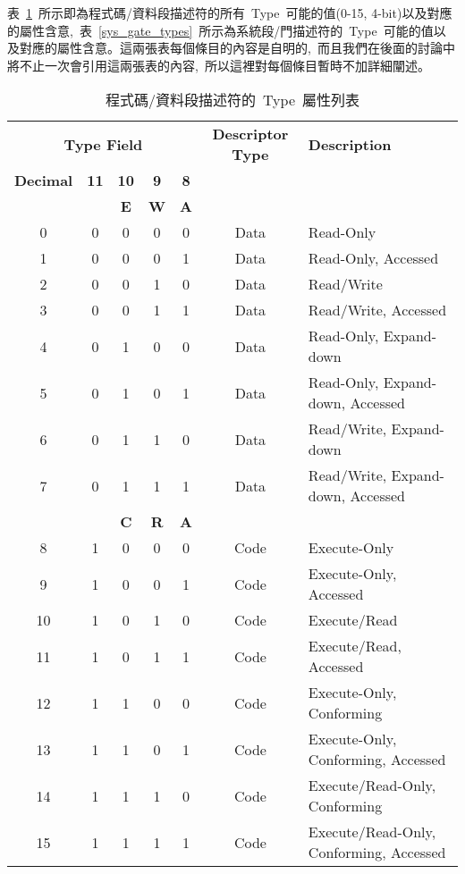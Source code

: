 \begin{itemize}
表~\ref{code_data_types}~所示即為程式碼/資料段描述符的所有~Type~可能的值(0-15, 4-bit)以及對應的屬性含意,~表~\ref{sys_gate_types}~所示為系統段/門描述符的~Type~可能的值以及對應的屬性含意。這兩張表每個條目的內容是自明的,~而且我們在後面的討論中將不止一次會引用這兩張表的內容,~所以這裡對每個條目暫時不加詳細闡述。

\begin{center}\begin{longtable}{c|c|c|c|c|c|l}
\caption[]{程式碼/資料段描述符的~Type~屬性列表}\label{code_data_types}\\
\hline
\multicolumn{5}{c|}{\textbf{Type Field}} & \textbf{Descriptor Type} & \textbf{Description}\bigstrut\\
\cline{1-5}
\textbf{Decimal} & \textbf{11} & \textbf{10} & \textbf{9} & \textbf{8} & & \\
        &    &  \textbf{E} & \textbf{W} & \textbf{A} & & \\
\hline
0 & 0 & 0 & 0 & 0 & Data & Read-Only\\
1 & 0 & 0 & 0 & 1 & Data & Read-Only, Accessed\\
2 & 0 & 0 & 1 & 0 & Data & Read/Write\\
3 & 0 & 0 & 1 & 1 & Data & Read/Write, Accessed\\
4 & 0 & 1 & 0 & 0 & Data & Read-Only, Expand-down\\
5 & 0 & 1 & 0 & 1 & Data & Read-Only, Expand-down, Accessed\\
6 & 0 & 1 & 1 & 0 & Data & Read/Write, Expand-down\\
7 & 0 & 1 & 1 & 1 & Data & Read/Write, Expand-down, Accessed\\
\hline
        &    &  \textbf{C} & \textbf{R} & \textbf{A} & & \\
\hline
8 & 1 & 0 & 0 & 0 & Code & Execute-Only\\
9 & 1 & 0 & 0 & 1 & Code & Execute-Only, Accessed\\
10 & 1 & 0 & 1 & 0 & Code & Execute/Read\\
11 & 1 & 0 & 1 & 1 & Code & Execute/Read, Accessed\\
12 & 1 & 1 & 0 & 0 & Code & Execute-Only, Conforming\\
13 & 1 & 1 & 0 & 1 & Code & Execute-Only, Conforming, Accessed\\
14 & 1 & 1 & 1 & 0 & Code & Execute/Read-Only, Conforming\\
15 & 1 & 1 & 1 & 1 & Code & Execute/Read-Only, Conforming, Accessed\\
\hline
\end{longtable}\end{center}


\end{itemize}
